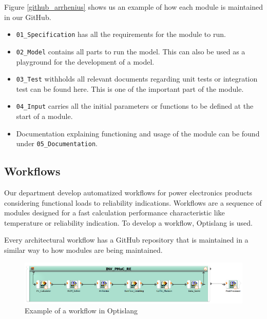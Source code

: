 Figure \ref{github_arrhenius} shows us an example of how each module is maintained in our GitHub.
\begin{itemize}
    \item \verb|01_Specification| has all the requirements for the module to run.
    \item \verb|02_Model| contains all parts to run the model. This can also be used as a playground for the development of a model.
    \item \verb|03_Test| withholds all relevant documents regarding unit tests or integration test can be found here. This is one of the important part 
                        of the module.
    \item \verb|04_Input| carries all the initial parameters or functions to be defined at the start of a module.
    \item Documentation explaining functioning and usage of the module can be found under \verb|05_Documentation|.
\end{itemize}
\subsection{Workflows}
Our department develop automatized workflows for power electronics products considering functional loads to reliability indications. Workflows are a sequence
of modules designed for a fast calculation performance characteristic like temperature or reliability indication. To develop a workflow, Optislang is used.


Every architectural workflow has a GitHub repository that is maintained in a similar way to how modules are being maintained.

\begin{figure}[!h]
    \centering
    \includegraphics[width=\textwidth]{Images/workflow_example.png}
    \caption{Example of a workflow in Optislang}
    \label{workflow_example}
\end{figure}

